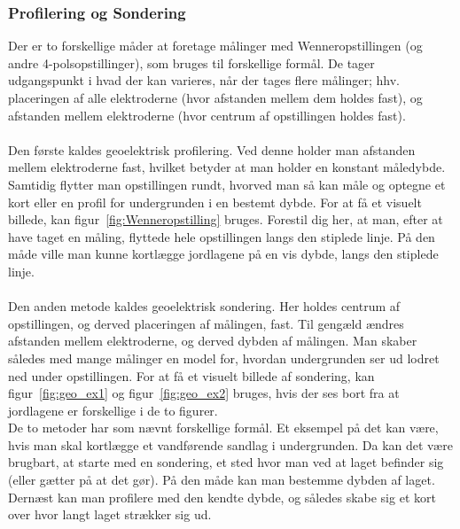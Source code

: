 \subsubsection{Profilering og Sondering} \label{Profilering og Sondering}
Der er to forskellige måder at foretage målinger med Wenneropstillingen (og andre 4-polsopstillinger), som bruges til forskellige formål. De tager udgangspunkt i hvad der kan varieres, når der tages flere målinger; hhv. placeringen af alle elektroderne (hvor afstanden mellem dem holdes fast), og afstanden mellem elektroderne (hvor centrum af opstillingen holdes fast). \\ \\
%
%
Den første kaldes geoelektrisk profilering. Ved denne holder man afstanden mellem elektroderne fast, hvilket betyder at man holder en konstant måledybde. Samtidig flytter man opstillingen rundt, hvorved man så kan måle og optegne et kort eller en profil for undergrunden i en bestemt dybde. For at få et visuelt billede, kan figur~\ref{fig:Wenneropstilling} bruges. Forestil dig her, at man, efter at have taget en måling, flyttede hele opstillingen langs den stiplede linje. På den måde ville man kunne kortlægge jordlagene på en vis dybde, langs den stiplede linje.\\ \\
%
%
Den anden metode kaldes geoelektrisk sondering. Her holdes centrum af opstillingen, og derved placeringen af målingen, fast. Til gengæld ændres afstanden mellem elektroderne, og derved dybden af målingen. Man skaber således med mange målinger en model for, hvordan undergrunden ser ud lodret ned under opstillingen. For at få et visuelt billede af sondering, kan figur~\ref{fig:geo_ex1} og figur~\ref{fig:geo_ex2} bruges, hvis der ses bort fra at jordlagene er forskellige i de to figurer. \\
De to metoder har som nævnt forskellige formål. Et eksempel på det kan være, hvis man skal kortlægge et vandførende sandlag i undergrunden. Da kan det være brugbart, at starte med en sondering, et sted hvor man ved at laget befinder sig (eller gætter på at det gør). På den måde kan man bestemme dybden af laget. Dernæst kan man profilere med den kendte dybde, og således skabe sig et kort over hvor langt laget strækker sig ud.


